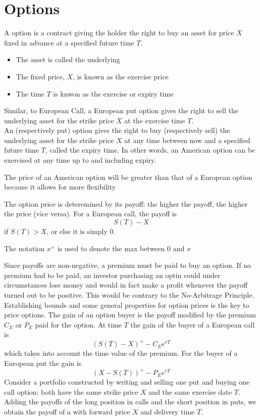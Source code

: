 \documentclass{article}
\begin{document}
\section{Options}

A  option is a contract giving the holder the right to buy an asset for price $X$ fixed in advance at a specified future time $T$. 
\begin{itemize}
  \item The asset is called the underlying 
  \item The fixed price, $X$, is known as the exercise price 
  \item The time $T$ is knwon as the exercise or expiry time
\end{itemize}
Similar, to European Call, a European put option gives the right to sell the underlying asset for the strike price $X$ at the exercise time $T$. \\ 

An  (respectively put) option gives the right to buy (respectively sell) the underlying asset for the strike price $X$ at any time between now and a specified future time $T$, called the expiry time. In other words, an American option can be exercised at any time up to and including expiry.  

\begin{remark}
  The price of an American option will be greater than that of a European option because it allows for more flexibility
\end{remark}

The option price is deteremined by its payoff: the higher the payoff, the higher the price (vice versa). For a European call, the payoff is $$S(T) - X$$ if $S(T) > X$, or else it is simply 0. 

\begin{remark}
  The notation $x^{+}$ is used to denote the max between 0 and $x$
\end{remark}

Since payoffs are non-negative, a premium must be paid to buy an option. If no premium had to be paid, an investor purchasing an optin could under circumstances lose money and would in fact make a profit whenever the payoff turned out to be positive. This would be contrary to the No-Arbitrage Principle. \\ 

Establishing bounds and some general properties for option prices is the key to price options. The gain of an option buyer is the payoff modified by the premium $C_E$ or $P_E$ paid for the option. At time $T$ the gain of the buyer of a European call is $$(S(T) - X)^+ - C_E e^{rT}$$ which takes into account the time value of the premium. For the buyer of a European put the gain is $$(X - S(T))^+ - P_E e^{rT}$$ Consider a portfolio constructed by writing and selling one put and buying one call option: both have the same strike price $X$ and the same exercise date $T$. Adding the payoffs of the long position in calls and the short position in puts, we obtain the payoff of a  with forward price $X$ and delivery time $T$.\\ 
\end{document}
